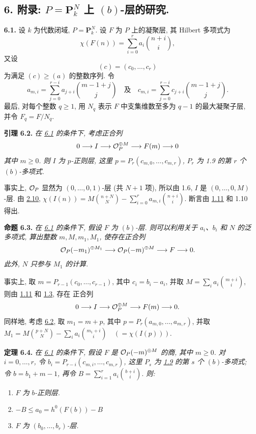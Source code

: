 \subsection*{6. 附录: $P=\mathbf P^N_k$ 上 $(b)$-层的研究.}

\textbf{6.1.} 设 $k$ 为代数闭域, $P=\mathbf P^N_k$. 设 $F$ 为 $P$ 上的凝聚层, 其 Hilbert 多项式为
\[
  \chi(F(n))=\sum_{i=0}^{r}a_i\binom{n+i}{i},
\]
又设
\[
  (c)=(c_0,\ldots,c_r)
\]
为满足 $(c)\geq(a)$ 的整数序列. 令
\[
  a_{m,i}=\sum_{j=0}^{r-i}a_{j+i}\binom{m-1+j}{j}
  \quad\text{及}\quad
  c_{m,i}=\sum_{j=0}^{r-i}c_{j+i}\binom{m-1+j}{j}.
\]
最后, 对每个整数 $q\geq1$, 用 $N_q$ 表示 $F$ 中支集维数至多为 $q-1$ 的最大凝聚子层, 并令 $F_q=F/N_q$.

\textbf{引理 6.2.} \emph{在 \hyperlink{sga6.e13.para.6-1}{6.1} 的条件下, 考虑正合列
\[
  0\longrightarrow I\longrightarrow\mathcal O_P^{\oplus M}
  \longrightarrow F(m)\longrightarrow0
\]
其中 $m\geq0$. 则 $I$ 为 $p$-正则层, 这里
\(p=P_r(c_{m,0},\ldots,c_{m,r})\), $P_r$ 为 1.9 的第 $r$ 个
$(b)$-多项式.}

事实上, $\mathcal O_P$ 显然为 $(0,\ldots,0,1)$-层 (共 $N+1$ 项), 所以由 1.6,
$I$ 是 $(0,\ldots,0,M)$-层. 由 \hyperlink{sga6.e13.rem.2-10}{2.10},
\(\chi(I(n))=M\binom{n+N}{N}
-\sum_{i=0}^{r}a_{m,i}\binom{n+i}{i}\). 断言由
\hyperlink{sga6.e13.thm.1-11}{1.11} 和 1.10 得出.

\textbf{命题 6.3.} \emph{在 \hyperlink{sga6.e13.para.6-1}{6.1} 的条件下, 假设 $F$ 为 $(b)$-层. 则可以利用关于 $a_i$、$b_i$ 和 $N$ 的泛多项式, 算出整数 $m,M,m_1,M_1$, 使存在正合列
\[
  \mathcal O_P(-m_1)^{\oplus M_1}\longrightarrow
  \mathcal O_P(-m)^{\oplus M}\longrightarrow F\longrightarrow0.
\]
此外, $N$ 只参与 $M_1$ 的计算.}

事实上, 取 $m=P_{r-1}(c_0,\ldots,c_{r-1})$, 其中 $c_i=b_i-a_i$,
并取 $M=\sum_i a_i\binom{m+i}{i}$, 则由 \hyperlink{sga6.e13.thm.1-11}{1.11} 和 \hyperlink{sga6.e13.prop.1-3}{1.3}, 存在
正合列
\[
  0\longrightarrow I\longrightarrow\mathcal O_P^{\oplus M}
  \longrightarrow F(m)\longrightarrow0.
\]
同样地, 考虑 \hyperlink{sga6.e13.lem.6-2}{6.2}, 取 $m_1=m+p$, 其中
$p=P_r(a_{m,0},\ldots,a_{m,r})$, 并取
$M_1=M\binom{p+N}{N}-\sum_i a_i\binom{m_1+i}{i}
\quad(=\chi(I(p)))$.

\textbf{定理 6.4.} \emph{在 \hyperlink{sga6.e13.para.6-1}{6.1} 的条件下, 假设
$F$ 是 $\mathcal O_P(-m)^{\oplus M}$ 的商, 其中 $m\geq0$. 对 $i=0,\ldots,r$, 令
$b_i=P_{r-i}(c_{m,i},\ldots,c_{m,r})$, 这里 $P_s$
为 \hyperlink{sga6.e13.def.1-9}{1.9} 的第 $s$ 个 $(b)$-多项式; 令 $b=b_1+m-1$, 再令
$B=\sum_{i=1}^{r}a_i\binom{b+i}{i}$. 则:}
\begin{enumerate}[label=(\roman*)]
\item \emph{$F$ 为 $b$-正则层.}
\item \emph{$-B\leq a_0=h^0(F(b))-B$}
\item \emph{$F$ 为 $(b_0,\ldots,b_r)$-层.}
\end{enumerate}

